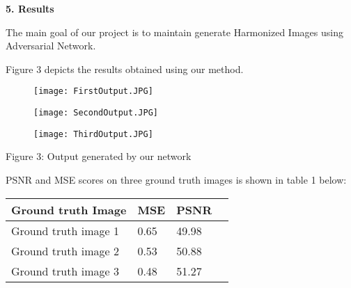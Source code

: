 \documentclass{article}
\begin{document}
\newpage

\begin{center}
\end{center}

\begin{flushleft}
\textbf{\large 5. Results}
\end{flushleft}

The main goal of our project is to maintain generate Harmonized Images using Adversarial Network.

\begin{flushleft}
Figure 3 depicts the results obtained using our method.
\end{flushleft}

\begin{figure}[htp]
    \centering
    \Large\texttt{[image: FirstOutput.JPG]}
    \label{fig:Output1}
\end{figure}

\begin{figure}[htp]
    \centering
    \Large\texttt{[image: SecondOutput.JPG]}
    \label{fig:Output2}
\end{figure}

\begin{figure}[htp]
    \centering
    \Large\texttt{[image: ThirdOutput.JPG]}
    \label{fig:Output3}
\end{figure}

\newpage
\begin{center}
\small Figure 3: Output generated by our network
\end{center}

\begin{center}
\end{center}

\begin{flushleft}
PSNR and MSE scores on three ground truth images is shown in table 1 below: \end{flushleft}

\begin{center}
    \begin{tabular}{ | l | l | l | p{3cm} |}
    \hline
        \textbf{Ground truth Image} & \textbf{MSE} & \textbf{PSNR}\\
    \hline
        Ground truth image 1  & 0.65  & 49.98 \\
    \hline
        Ground truth image 2  & 0.53  & 50.88  \\
    \hline
        Ground truth image 3  & 0.48  & 51.27  \\
    \hline
    \end{tabular}
\end{center}
\end{document}
